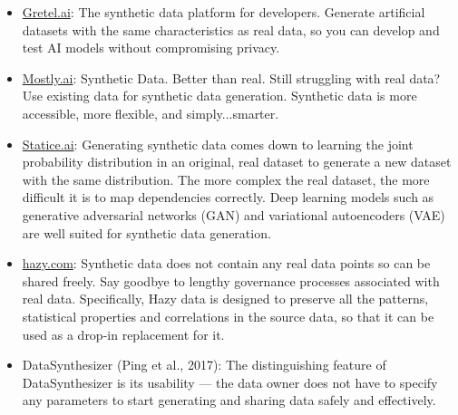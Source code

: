 \documentclass[t,8pt,utfx8]{beamer}
\begin{document}
\begin{spacing}{1.25}
{\begin{itemize}
    \item \url{Gretel.ai}: The synthetic data platform for developers. Generate artificial datasets with the same characteristics as real data, so you can develop and test AI models without compromising privacy.
    \item \url{Mostly.ai}: Synthetic Data. Better than real. Still struggling with real data? Use existing data for synthetic data generation. Synthetic data is more accessible, more flexible, and simply...smarter.
    \item \url{Statice.ai}: Generating synthetic data comes down to learning the joint probability distribution in an original, real dataset to generate a new dataset with the same distribution.  The more complex the real dataset, the more difficult it is to map dependencies correctly. Deep learning models such as generative adversarial networks (GAN) and variational autoencoders (VAE) are well suited for synthetic data generation.
    \item \url{hazy.com}: Synthetic data does not contain any real data points so can be shared freely. Say goodbye to lengthy governance processes associated with real data.  Specifically, Hazy data is designed to preserve all the patterns, statistical properties and correlations in the source data, so that it can be used as a drop-in replacement for it.
    \item DataSynthesizer (Ping et al., 2017): The distinguishing feature of DataSynthesizer is its usability — the data owner does not have to specify any parameters to start generating and sharing data safely and effectively.
\end{itemize}
}

\end{spacing}
\end{document}
